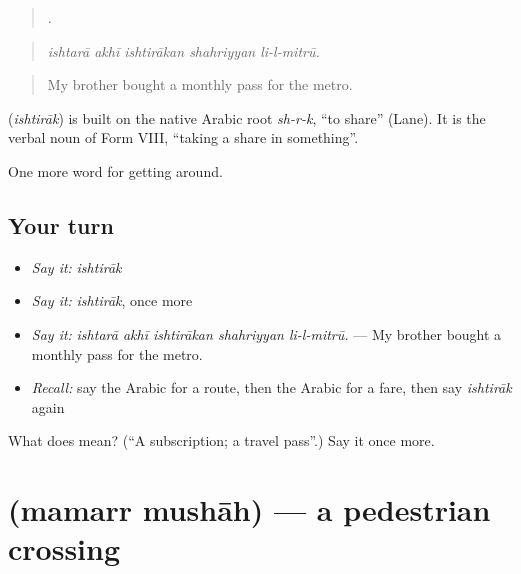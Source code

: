 \begin{quote}
    .
\end{quote}

\begin{quote}
\emph{ishtarā akhī ishtirākan shahriyyan li-l-mitrū.}
\end{quote}

\begin{quote}
My brother bought a monthly pass for the metro.
\end{quote}

\begin{cousinweb}
\textbf{} (\emph{ishtirāk}) is built on the native Arabic root \emph{sh-r-k}, \textquotedblleft{}to share\textquotedblright{} (Lane). It is the verbal noun of Form VIII, \textquotedblleft{}taking a share in something\textquotedblright{}.
\end{cousinweb}

\begin{grammarlens}[title={What you've built}]
One more word for getting around.
\end{grammarlens}

\subsection*{Your turn}
\begin{itemize}
\raggedright
  \item \emph{Say it:} \emph{ishtirāk}
  \item \emph{Say it:} \emph{ishtirāk}, once more
  \item \emph{Say it:} \emph{ishtarā akhī ishtirākan shahriyyan li-l-mitrū.} — My brother bought a monthly pass for the metro.
  \item \emph{Recall:} say the Arabic for a route, then the Arabic for a fare, then say \emph{ishtirāk} again
\end{itemize}

\begin{tcolorbox}[breakable,colback=teal!4,colframe=teal!35!black,title={Before you move on}]
What does  mean? (\textquotedblleft{}A subscription; a travel pass\textquotedblright{}.) Say it once more.
\end{tcolorbox}
\section[\texorpdfstring{\ar{ممر} \ar{مشاة} (mamarr mushāh)}{ممر مشاة (mamarr mushāh)}]{  (mamarr mushāh) — a pedestrian crossing}

